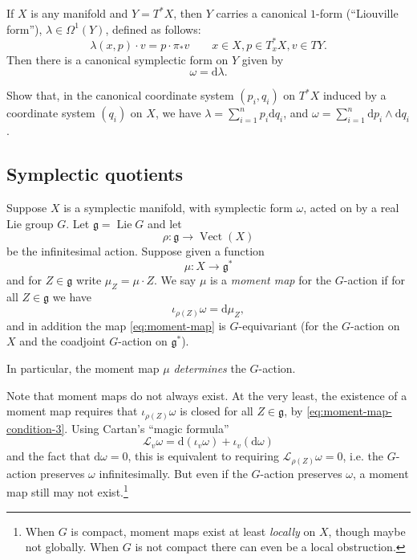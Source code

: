 \documentclass[12pt,letterpaper,reqno]{article}
\numberwithin{equation}{section}
\newcommand{\fg}{{\mathfrak g}}
\newcommand{\cL}{\ensuremath{\mathcal L}}
\newcommand{\de}{\mathrm{d}}
\newcommand{\ti}[1]{\textit{#1}}
\DeclareMathOperator{\Lie}{Lie}
\DeclareMathOperator{\Vect}{Vect}
\begin{document}
\begin{example}
If $X$ is any manifold and $Y = T^* X$, then $Y$ carries a canonical
$1$-form (``Liouville form''), $\lambda \in \Omega^1(Y)$,
defined as follows: 
\begin{equation}
  \lambda(x,p) \cdot v = p \cdot \pi_* v \qquad x \in X, p \in T^*_x X, v \in TY.
\end{equation}
Then there is a canonical symplectic form on $Y$ given by
\begin{equation}
\omega = \de \lambda.  
\end{equation}
\end{example}

\begin{exercise}
Show that, in the canonical coordinate system $(p_i,q_i)$
on $T^* X$ induced by a coordinate system $(q_i)$ on $X$, 
we have 
$\lambda = \sum_{i=1}^n p_i \de q_i$, and
$\omega = \sum_{i=1}^n \de p_i \wedge \de q_i$.
\end{exercise}


\subsection{Symplectic quotients}

\begin{defn} \label{def:moment-map}
Suppose $X$ is a symplectic manifold, with symplectic form $\omega$,
acted on by a real Lie group $G$. Let $\fg = \Lie G$ and let
\begin{equation}
\rho: \fg \to \Vect(X)  
\end{equation}
be the infinitesimal action.
Suppose given a function
\begin{equation} \label{eq:moment-map}
 \mu: X \to \fg^* 
\end{equation}
and for $Z \in \fg$ write $\mu_Z = \mu \cdot Z$.
We say $\mu$ is a \ti{moment map} for the $G$-action if 
for all $Z \in \fg$ we have
\begin{equation} \label{eq:moment-map-condition-3}
  \iota_{\rho(Z)} \omega = \de \mu_Z,
\end{equation}
and in addition the map \eqref{eq:moment-map} is $G$-equivariant
(for the $G$-action on $X$ and the coadjoint $G$-action on $\fg^*$).
\end{defn}
In particular, the moment map $\mu$ 
\ti{determines} the $G$-action.

Note that moment maps do not always exist.
At the very least, the existence of a moment
map requires that $\iota_{\rho(Z)} \omega$ is closed
for all $Z \in \fg$, by \eqref{eq:moment-map-condition-3}. Using 
Cartan's ``magic formula''
\begin{equation} \label{eq:cartan-magic-formula}
  \cL_v \omega = \de (\iota_v \omega) + \iota_v (\de \omega)
\end{equation}
and the fact that $\de \omega = 0$,
this is equivalent to requiring $\cL_{\rho(Z)}\omega = 0$,
i.e. the $G$-action preserves $\omega$ infinitesimally.
But even if the $G$-action preserves $\omega$,
a moment map still may not exist.\footnote{When $G$ is compact, 
moment maps exist at least
\ti{locally} on $X$, though maybe not globally. When $G$ is not
compact there can even be a local obstruction.}
\end{document}
